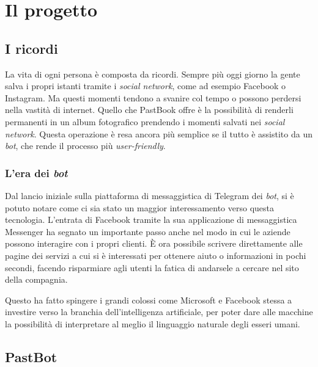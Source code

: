 
\chapter{Il progetto}
\label{cap:progetto}

\section{I ricordi}

La vita di ogni persona è composta da ricordi. Sempre più oggi giorno la gente
salva i propri istanti tramite i \textit{social network}, come ad esempio
Facebook o Instagram. Ma questi momenti tendono a svanire col tempo o possono
perdersi nella vastità di internet. Quello che PastBook offre è la
possibilità di renderli permanenti in un album fotografico prendendo i momenti
salvati nei \textit{social network}. Questa operazione è resa ancora più
semplice se il tutto è assistito da un \textit{bot}, che rende il processo più
\textit{user-friendly}.

\subsection{L'era dei \textit{bot}}

Dal lancio iniziale sulla piattaforma di messaggistica di Telegram dei
\textit{bot}, si è potuto notare come ci sia stato un maggior interessamento
verso questa tecnologia. L'entrata di Facebook tramite la sua applicazione di
messaggistica Messenger ha segnato un importante passo anche nel modo in cui le
aziende possono interagire con i propri clienti. È ora possibile scrivere
direttamente alle pagine dei servizi a cui si è interessati per ottenere aiuto o
informazioni in pochi secondi, facendo risparmiare agli utenti la fatica di
andarsele a cercare nel sito della compagnia.

Questo ha fatto spingere i grandi colossi come Microsoft e Facebook stessa a
investire verso la branchia dell'intelligenza artificiale, per poter dare
alle macchine la possibilità di interpretare al meglio il linguaggio naturale
degli esseri umani.

\newpage

\section{PastBot}

